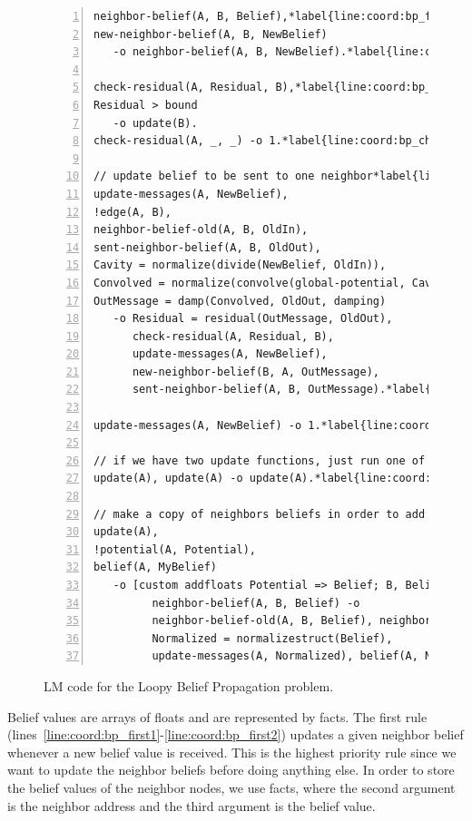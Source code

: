 \begin{figure}[h!]
\begin{Verbatim}[numbers=left, fontsize=\codesize, commandchars=\*\{\}]
neighbor-belief(A, B, Belief),*label{line:coord:bp_first1}
new-neighbor-belief(A, B, NewBelief)
   -o neighbor-belief(A, B, NewBelief).*label{line:coord:bp_first2}

check-residual(A, Residual, B),*label{line:coord:bp_check1}
Residual > bound
   -o update(B).
check-residual(A, _, _) -o 1.*label{line:coord:bp_check2}

// update belief to be sent to one neighbor*label{line:coord:bp_iterate1}
update-messages(A, NewBelief),
!edge(A, B),
neighbor-belief-old(A, B, OldIn),
sent-neighbor-belief(A, B, OldOut),
Cavity = normalize(divide(NewBelief, OldIn)),
Convolved = normalize(convolve(global-potential, Cavity)),
OutMessage = damp(Convolved, OldOut, damping)
   -o Residual = residual(OutMessage, OldOut),
      check-residual(A, Residual, B),
      update-messages(A, NewBelief),
      new-neighbor-belief(B, A, OutMessage),
      sent-neighbor-belief(A, B, OutMessage).*label{line:coord:bp_iterate2}

update-messages(A, NewBelief) -o 1.*label{line:coord:bp_iterate_final}

// if we have two update functions, just run one of them*label{line:coord:bp_last1}
update(A), update(A) -o update(A).*label{line:coord:bp_update}

// make a copy of neighbors beliefs in order to add them up*label{line:coord:bp_update1}
update(A),
!potential(A, Potential),
belief(A, MyBelief)
   -o [custom addfloats Potential => Belief; B, Belief |*label{line:coord:bp_agg1}
         neighbor-belief(A, B, Belief) -o
         neighbor-belief-old(A, B, Belief), neighbor-belief(A, B, Belief) ->
         Normalized = normalizestruct(Belief),
         update-messages(A, Normalized), belief(A, Normalized)].*label{line:coord:bp_last2}*label{line:coord:bp_update2}*label{line:coord:bp_agg2}
\end{Verbatim}
\caption{LM code for the Loopy Belief Propagation problem.}
\label{code:coordination:bp}
\end{figure}

Belief values are arrays of floats and are represented by  facts.
The first rule (lines~\ref{line:coord:bp_first1}-\ref{line:coord:bp_first2})
updates a given neighbor belief whenever a new belief value is received. This is
the highest priority rule since we want to update the neighbor beliefs before
doing anything else. In order to store the belief values of the neighbor nodes,
we use  facts, where the second argument is the neighbor
address and the third argument is the belief value.


